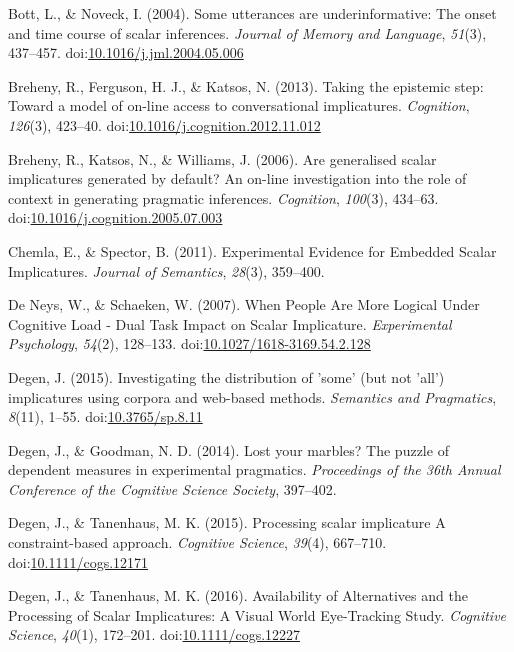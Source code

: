 \documentclass[floatsintext,man]{apa6}
\theoremstyle{definition}
\theoremstyle{definition}
\theoremstyle{definition}
\theoremstyle{remark}
\begin{document}
\hypertarget{ref-Bott2004}{}
Bott, L., \& Noveck, I. (2004). Some utterances are underinformative:
The onset and time course of scalar inferences. \emph{Journal of Memory
and Language}, \emph{51}(3), 437--457.
doi:\href{https://doi.org/10.1016/j.jml.2004.05.006}{10.1016/j.jml.2004.05.006}

\hypertarget{ref-Breheny2013}{}
Breheny, R., Ferguson, H. J., \& Katsos, N. (2013). Taking the epistemic
step: Toward a model of on-line access to conversational implicatures.
\emph{Cognition}, \emph{126}(3), 423--40.
doi:\href{https://doi.org/10.1016/j.cognition.2012.11.012}{10.1016/j.cognition.2012.11.012}

\hypertarget{ref-Breheny2006}{}
Breheny, R., Katsos, N., \& Williams, J. (2006). Are generalised scalar
implicatures generated by default? An on-line investigation into the
role of context in generating pragmatic inferences. \emph{Cognition},
\emph{100}(3), 434--63.
doi:\href{https://doi.org/10.1016/j.cognition.2005.07.003}{10.1016/j.cognition.2005.07.003}

\hypertarget{ref-Chemla2011}{}
Chemla, E., \& Spector, B. (2011). Experimental Evidence for Embedded
Scalar Implicatures. \emph{Journal of Semantics}, \emph{28}(3),
359--400.

\hypertarget{ref-DeNeys2007}{}
De Neys, W., \& Schaeken, W. (2007). When People Are More Logical Under
Cognitive Load - Dual Task Impact on Scalar Implicature.
\emph{Experimental Psychology}, \emph{54}(2), 128--133.
doi:\href{https://doi.org/10.1027/1618-3169.54.2.128}{10.1027/1618-3169.54.2.128}

\hypertarget{ref-Degen2015}{}
Degen, J. (2015). Investigating the distribution of 'some' (but not
'all') implicatures using corpora and web-based methods. \emph{Semantics
and Pragmatics}, \emph{8}(11), 1--55.
doi:\href{https://doi.org/10.3765/sp.8.11}{10.3765/sp.8.11}

\hypertarget{ref-Degen2014}{}
Degen, J., \& Goodman, N. D. (2014). Lost your marbles? The puzzle of
dependent measures in experimental pragmatics. \emph{Proceedings of the
36th Annual Conference of the Cognitive Science Society}, 397--402.

\hypertarget{ref-DegenTanenhaus2015}{}
Degen, J., \& Tanenhaus, M. K. (2015). Processing scalar implicature A
constraint-based approach. \emph{Cognitive Science}, \emph{39}(4),
667--710.
doi:\href{https://doi.org/10.1111/cogs.12171}{10.1111/cogs.12171}

\hypertarget{ref-DegenTanenhaus2016}{}
Degen, J., \& Tanenhaus, M. K. (2016). Availability of Alternatives and
the Processing of Scalar Implicatures: A Visual World Eye-Tracking
Study. \emph{Cognitive Science}, \emph{40}(1), 172--201.
doi:\href{https://doi.org/10.1111/cogs.12227}{10.1111/cogs.12227}
\end{document}
